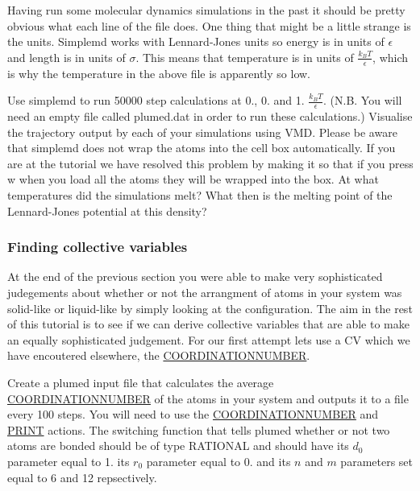 Having run some molecular dynamics simulations in the past it should be pretty obvious what each line of the file does. One thing that might be a little strange is the units. Simplemd works with Lennard-\/\+Jones units so energy is in units of $\epsilon$ and length is in units of $\sigma$. This means that temperature is in units of $\frac{k_B T}{\epsilon}$, which is why the temperature in the above file is apparently so low.

Use simplemd to run 50000 step calculations at 0., 0. and 1. $\frac{k_B T}{\epsilon}$. (N.\+B. You will need an empty file called plumed.\+dat in order to run these calculations.) Visualise the trajectory output by each of your simulations using V\+M\+D. Please be aware that simplemd does not wrap the atoms into the cell box automatically. If you are at the tutorial we have resolved this problem by making it so that if you press w when you load all the atoms they will be wrapped into the box. At what temperatures did the simulations melt? What then is the melting point of the Lennard-\/\+Jones potential at this density?\hypertarget{belfast-10_cvs}{}\subsubsection{Finding collective variables}\label{belfast-10_cvs}
At the end of the previous section you were able to make very sophisticated judegements about whether or not the arrangment of atoms in your system was solid-\/like or liquid-\/like by simply looking at the configuration. The aim in the rest of this tutorial is to see if we can derive collective variables that are able to make an equally sophisticated judgement. For our first attempt lets use a C\+V which we have encoutered elsewhere, the \hyperlink{COORDINATIONNUMBER}{C\+O\+O\+R\+D\+I\+N\+A\+T\+I\+O\+N\+N\+U\+M\+B\+E\+R}.

Create a plumed input file that calculates the average \hyperlink{COORDINATIONNUMBER}{C\+O\+O\+R\+D\+I\+N\+A\+T\+I\+O\+N\+N\+U\+M\+B\+E\+R} of the atoms in your system and outputs it to a file every 100 steps. You will need to use the \hyperlink{COORDINATIONNUMBER}{C\+O\+O\+R\+D\+I\+N\+A\+T\+I\+O\+N\+N\+U\+M\+B\+E\+R} and \hyperlink{PRINT}{P\+R\+I\+N\+T} actions. The switching function that tells plumed whether or not two atoms are bonded should be of type R\+A\+T\+I\+O\+N\+A\+L and should have its $d_0$ parameter equal to 1. its $r_0$ parameter equal to 0. and its $n$ and $m$ parameters set equal to 6 and 12 repsectively.

